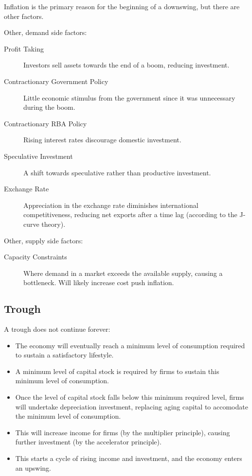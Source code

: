 \documentclass[a4paper,11pt]{report}
\begin{document}
Inflation is the primary reason for the beginning of a downswing, but there are
other factors.

Other, demand side factors:

\begin{description}
\item [Profit Taking] Investors sell assets towards the end of a boom, reducing
	investment.
\item [Contractionary Government Policy] Little economic stimulus from the
	government since it was unnecessary during the boom.
\item [Contractionary RBA Policy] Rising interest rates discourage domestic
	investment.
\item [Speculative Investment] A shift towards speculative rather than
	productive investment.
\item [Exchange Rate] Appreciation in the exchange rate diminishes international
	competitiveness, reducing net exports after a time lag (according to the
	J-curve theory).
\end{description}

Other, supply side factors:

\begin{description}
\item [Capacity Constraints] Where demand in a market exceeds the available
	supply, causing a bottleneck. Will likely increase cost push inflation.
\end{description}

\subsection{Trough}

A trough does not continue forever:

\begin{itemize}
\item The economy will eventually reach a minimum level of consumption required
	to sustain a satisfactory lifestyle.
\item A minimum level of capital stock is required by firms to sustain this
	minimum level of consumption.
\item Once the level of capital stock falls below this minimum required level,
	firms will undertake depreciation investment, replacing aging capital to
	accomodate the minimum level of consumption.
\item This will increase income for firms (by the multiplier principle), causing
	further investment (by the accelerator principle).
\item This starts a cycle of rising income and investment, and the economy
	enters an upswing.
\end{itemize}
\end{document}
